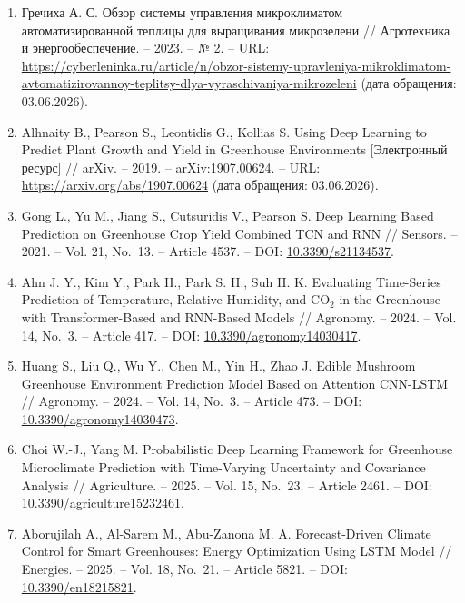 \documentclass[a4paper,14pt]{extarticle}
\begin{document}
\begin{enumerate}
  работа. -- Екатеринбург: Уральский государственный педагогический
  университет, 2021. -- URL: \url{http://elar.uspu.ru/handle/uspu/15860}
  (дата обращения: 03.06.2026).
\item
  Гречиха А. С. Обзор системы управления микроклиматом
  автоматизированной теплицы для выращивания микрозелени // Агротехника
  и энергообеспечение. -- 2023. -- № 2. -- URL:
  \url{https://cyberleninka.ru/article/n/obzor-sistemy-upravleniya-mikroklimatom-avtomatizirovannoy-teplitsy-dlya-vyraschivaniya-mikrozeleni}
  (дата обращения: 03.06.2026).
\item
  Alhnaity B., Pearson S., Leontidis G., Kollias S. Using Deep Learning
  to Predict Plant Growth and Yield in Greenhouse Environments
  {[}Электронный ресурс{]} // arXiv. -- 2019. -- arXiv:1907.00624. --
  URL: \url{https://arxiv.org/abs/1907.00624} (дата обращения:
  03.06.2026).
\item
  Gong L., Yu M., Jiang S., Cutsuridis V., Pearson S. Deep Learning
  Based Prediction on Greenhouse Crop Yield Combined TCN and RNN //
  Sensors. -- 2021. -- Vol. 21, No.~13. -- Article 4537. -- DOI:
  \href{https://doi.org/10.3390/s21134537}{10.3390/s21134537}.
\item
  Ahn J. Y., Kim Y., Park H., Park S. H., Suh H. K. Evaluating
  Time-Series Prediction of Temperature, Relative Humidity, and CO\(_2\)
  in the Greenhouse with Transformer-Based and RNN-Based Models //
  Agronomy. -- 2024. -- Vol. 14, No.~3. -- Article 417. -- DOI:
  \href{https://doi.org/10.3390/agronomy14030417}{10.3390/agronomy14030417}.
\item
  Huang S., Liu Q., Wu Y., Chen M., Yin H., Zhao J. Edible Mushroom
  Greenhouse Environment Prediction Model Based on Attention CNN-LSTM //
  Agronomy. -- 2024. -- Vol. 14, No.~3. -- Article 473. -- DOI:
  \href{https://doi.org/10.3390/agronomy14030473}{10.3390/agronomy14030473}.
\item
  Choi W.-J., Yang M. Probabilistic Deep Learning Framework for
  Greenhouse Microclimate Prediction with Time-Varying Uncertainty and
  Covariance Analysis // Agriculture. -- 2025. -- Vol. 15, No.~23. --
  Article 2461. -- DOI:
  \href{https://doi.org/10.3390/agriculture15232461}{10.3390/agriculture15232461}.
\item
  Aborujilah A., Al-Sarem M., Abu-Zanona M. A. Forecast-Driven Climate
  Control for Smart Greenhouses: Energy Optimization Using LSTM Model //
  Energies. -- 2025. -- Vol. 18, No.~21. -- Article 5821. -- DOI:
  \href{https://doi.org/10.3390/en18215821}{10.3390/en18215821}.

\end{enumerate}
\end{document}
